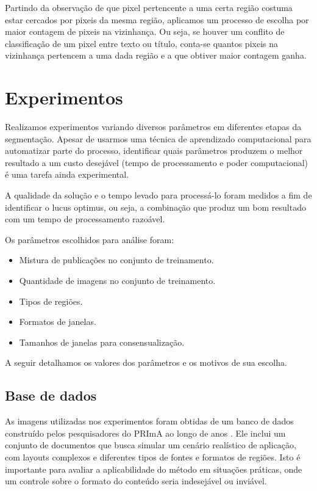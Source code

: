 \documentclass[a4paper,11pt]{article}
\begin{document}
      Partindo da observação de que pixel pertencente a uma certa região costuma estar cercados por pixeis da mesma região, aplicamos um processo de escolha por maior contagem de pixeis na vizinhança. Ou seja, se houver um conflito de classificação de um pixel entre texto ou título, conta-se quantos pixeis na vizinhança pertencem a uma dada região e a que obtiver maior contagem ganha.

\clearpage

\section{Experimentos}
\label{sec:experimentos}

  Realizamos experimentos variando diversos parâmetros em diferentes etapas da segmentação. Apesar de usarmos uma técnica de aprendizado computacional para automatizar parte do processo, identificar quais parâmetros produzem o melhor resultado a um custo desejável (tempo de processamento e poder computacional) é uma tarefa ainda experimental.

  A qualidade da solução e o tempo levado para processá-lo foram medidos a fim de identificar o lucus optimus, ou seja, a combinação que produz um bom resultado com um tempo de processamento razoável.

  Os parâmetros escolhidos para análise foram:

  \begin{itemize}
    \item Mistura de publicações no conjunto de treinamento.
    \item Quantidade de imagens no conjunto de treinamento.
    \item Tipos de regiões.
    \item Formatos de janelas.
    \item Tamanhos de janelas para consensualização.
  \end{itemize}

  A seguir detalhamos os valores dos parâmetros e os motivos de sua escolha.

  \subsection{Base de dados}

    As imagens utilizadas nos experimentos foram obtidas de um banco de dados construído pelos pesquisadores do PRImA ao longo de anos \cite{Antonacopoulos09arealistic}. Ele inclui um conjunto de documentos que busca simular um cenário realístico de aplicação, com layouts complexos e diferentes tipos de fontes e formatos de regiões. Isto é importante para avaliar a aplicabilidade do método em situações práticas, onde um controle sobre o formato do conteúdo seria indesejável ou inviável.
\end{document}
